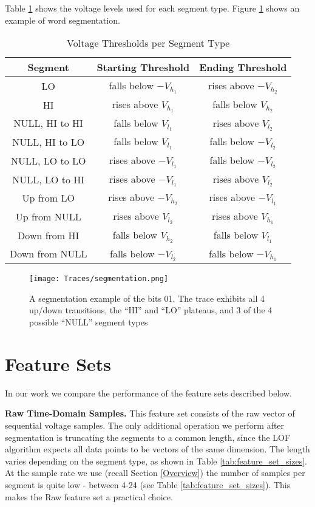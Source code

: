 \documentclass[compsoc,conference,a4paper]{IEEEtran}
\newcommand{\level}[1]{\section{#1}}
\newcommand{\level}[1]{\chapter{#1}}
\begin{document}
  Table \ref{tab:SegmentationLevels} shows the voltage levels used for each segment type. Figure \ref{fig:SegmentationTrace} shows an example of word segmentation.
  
  \begin{table}
    \caption{Voltage Thresholds per Segment Type}
    \label{tab:SegmentationLevels}
    \centering
    \begin{tabular}{|c c c|} 
      \hline
      Segment & Starting Threshold & Ending Threshold \\ [0.5ex] 
      \hline\hline
      LO & falls below $-V_{h_1}$ & rises above $-V_{h_2}$ \\
      \hline
      HI & rises above $V_{h_1}$ & falls below $V_{h_2}$ \\
      \hline
      NULL, HI to HI & falls below $V_{l_1}$ & rises above $V_{l_2}$ \\
      \hline
      NULL, HI to LO & falls below $V_{l_1}$ & falls below $-V_{l_2}$ \\
      \hline
      NULL, LO to LO & rises above $-V_{l_1}$ & falls below $-V_{l_2}$ \\
      \hline
      NULL, LO to HI & rises above $-V_{l_1}$ & rises above $V_{l_2}$ \\
      \hline
      Up from LO & rises above $-V_{h_2}$ & rises above $-V_{l_1}$ \\
      \hline
      Up from NULL & rises above $V_{l_2}$ & rises above $V_{h_1}$ \\
      \hline
      Down from HI & falls below $V_{h_2}$ & falls below $V_{l_1}$ \\
      \hline
      Down from NULL & falls below $-V_{l_2}$ & falls below $-V_{h_1}$ \\
      \hline
    \end{tabular}
  \end{table}
  
  \begin{figure}[t]
    \centering
    \texttt{[image: Traces/segmentation.png]}
    \caption{A segmentation example of the bits 01. The trace exhibits all 4 up/down transitions, the ``HI'' and ``LO'' plateaus, and 3 of the 4 possible ``NULL'' segment types}
    \label{fig:SegmentationTrace}
  \end{figure}
  
\level{Feature Sets} \label{FeatureSets}
  In our work we compare the performance of the feature sets described below.
 
{\bf Raw Time-Domain Samples.}
  This feature set consists of the raw vector of sequential voltage samples. The only additional operation we perform after segmentation is truncating the segments to a common length, since the LOF algorithm expects all data points to be vectors of the same dimension. The length varies depending on the segment type, as shown in Table \ref{tab:feature_set_sizes}. At the sample rate we use (recall Section \ref{Overview}) the number of samples per segment is quite low - between 4-24 (see Table \ref{tab:feature_set_sizes}). This makes the Raw feature set a practical choice.
  
\end{document}
